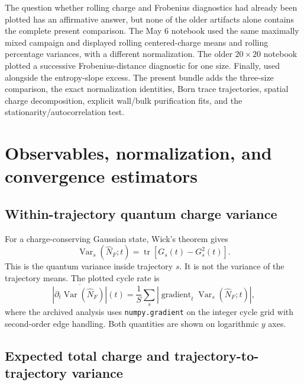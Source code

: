 \documentclass[aps,prb,twocolumn,nofootinbib,superscriptaddress,floatfix]{revtex4-2}
\newcommand{\tr}{\operatorname{tr}}
\newcommand{\Var}{\operatorname{Var}}
\begin{document}
The question whether rolling charge and Frobenius diagnostics had already
been plotted has an affirmative answer, but none of the older artifacts alone
contains the complete present comparison.  The May 6 notebook
used the same maximally mixed campaign and displayed rolling centered-charge
means and rolling percentage variances, with a different normalization.  The
older $20\times20$ notebook
 plotted a successive
Frobenius-distance diagnostic for one size.  Finally,
 used
 alongside the entropy-slope excess.
The present bundle adds the three-size comparison, the exact normalization
identities, Born trace trajectories, spatial charge decomposition, explicit
wall/bulk purification fits, and the stationarity/autocorrelation test.

\section{Observables, normalization, and convergence estimators}
\label{sec:estimators}

\subsection{Within-trajectory quantum charge variance}

For a charge-conserving Gaussian state, Wick's theorem gives
\begin{equation}
 \Var_s(\hat N_F;t)
 =\tr\!\left[G_s(t)-G_s^2(t)\right].
 \label{eq:chargevariance}
\end{equation}
This is the quantum variance inside trajectory $s$.  It is not the variance of
the trajectory means.  The plotted cycle rate is
\begin{equation}
 \overline{\left|\partial_t\Var(\hat N_F)\right|}(t)
 =\frac1S\sum_s
 \left|\operatorname{gradient}_t\Var_s(\hat N_F;t)\right|,
 \label{eq:chargevariancerate}
\end{equation}
where the archived analysis uses \texttt{numpy.gradient} on the integer cycle
grid with second-order edge handling.  Both quantities are shown on logarithmic
$y$ axes.

\subsection{Expected total charge and trajectory-to-trajectory variance}
\end{document}
